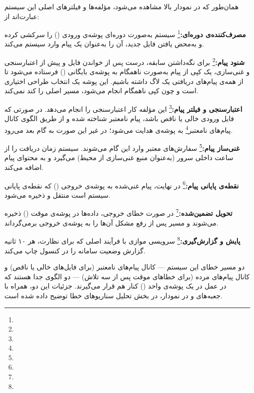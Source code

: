 \documentclass[a4paper,12pt]{article}
\newcommand{\term}[1]{\textbf{\textcolor{sbublue2}{#1:}}}
\begin{document}
همان‌طور که در نمودار بالا مشاهده می‌شود، مؤلفه‌ها و فیلترهای اصلی این سیستم عبارت‌اند از:
\begin{terms}
  \item \term{مصرف‌کننده‌ی دوره‌ای}\footnote{} سیستم به‌صورت دوره‌ای پوشه‌ی ورودی () را سرکشی کرده و به‌محض یافتن فایل جدید، آن را به‌عنوان یک پیام وارد سیستم می‌کند.
  \item \term{شنود پیام}\footnote{} برای نگه‌داشتن سابقه، درست پس از خواندن فایل و پیش از اعتبارسنجی و غنی‌سازی، یک کپی از پیام به‌صورت ناهمگام به پوشه‌ی بایگانی () فرستاده می‌شود تا از همه‌ی پیام‌های دریافتی یک لاگ داشته باشیم. این پوشه یک انتخاب طراحی اختیاری است و چون کپی ناهمگام انجام می‌شود، مسیر اصلی را کند نمی‌کند.
  \item \term{اعتبارسنجی و فیلتر پیام}\footnote{} این مؤلفه کار اعتبارسنجی را انجام می‌دهد. در صورتی که فایل ورودی خالی یا ناقص باشد، پیام نامعتبر شناخته شده و از طریق الگوی کانال پیام‌های نامعتبر\footnote{} به پوشه‌ی  هدایت می‌شود؛ در غیر این صورت به گام بعد می‌رود.
  \item \term{غنی‌ساز پیام}\footnote{} سفارش‌های معتبر وارد این گام می‌شوند. سیستم زمان دریافت را از ساعت داخلی سرور (به‌عنوان منبع غنی‌سازی از محیط) می‌گیرد و به محتوای پیام اضافه می‌کند.
  \item \term{نقطه‌ی پایانی پیام}\footnote{} در نهایت، پیام غنی‌شده به پوشه‌ی خروجی () که نقطه‌ی پایانی سیستم است منتقل و ذخیره می‌شود.
  \item \term{تحویل تضمین‌شده}\footnote{} در صورت خطای خروجی، داده‌ها در پوشه‌ی موقت () ذخیره می‌شوند و مسیر  پس از رفع مشکل آن‌ها را به پوشه‌ی خروجی برمی‌گرداند.
  \item \term{پایش و گزارش‌گیری}\footnote{} سرویسی موازی با فرآیند اصلی که برای نظارت، هر ۱۰ ثانیه گزارش وضعیت سامانه را در کنسول چاپ می‌کند.
\end{terms}

دو مسیر خطای این سیستم — کانال پیام‌های نامعتبر (برای فایل‌های خالی یا ناقص) و کانال پیام‌های مرده (برای خطاهای موقت پس از سه تلاش) — دو الگوی جدا هستند که در عمل در یک پوشه‌ی واحد () کنار هم قرار می‌گیرند. جزئیات این دو، همراه با جعبه‌های  و  در نمودار، در بخش تحلیل سناریوهای خطا توضیح داده شده است.
\end{document}
